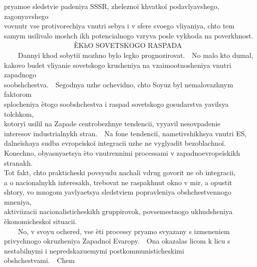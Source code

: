 {pryamoe sledstvie padeniya SSSR, zhelezno{\u i} khvatko{\u i} podavlyavshego, zagonyavshego\\
vovnutr{\cprime} vse protivorechiya vnutri sebya i v sfere svoego vliyaniya, chto tem\\
samym usilivalo moshch{\cprime} ikh potencial{\cprime}nogo vzryva posle vykhoda na poverkhnost{\cprime}.\\
{\ \ }{\ \ }{\ \ }{\ \ }{\ \ }{\ \ }{\ \ }{\ \ }{\ \ }{\ \ }\`EKhO SOVET{\cydot}SKOGO RASPADA\\
{\ \ }{\ \ }Danny{\u i} khod sobyti{\u i} mozhno bylo legko prognozirovat{\cprime}.{\ \ }No malo kto dumal,\\
kakovo budet vliyanie sovet{\cydot}skogo krusheniya na vzaimootnosheniya vnutri zapadnogo\\
soobshchestva.{\ \ }Segodnya uzhe ochevidno, chto Soyuz byl nemalovazhnym faktorom\\
splocheniya \`etogo soobshchestva i raspad sovet{\cydot}skogo gosudarstva yavilsya tolchkom,\\
kotory{\u i} usilil na Zapade centrobezhnye tendencii, vyyavil nesovpadenie\\
interesov industrial{\cprime}nykh stran.{\ \ }Na fone tendenci{\u i}, nametivshikhsya vnutri ES,\\
dal{\cprime}ne{\u i}shaya sud{\cprime}ba evrope{\u i}sko{\u i} integracii uzhe ne vyglyadit bezoblachno{\u i}.\\
Konechno, ob{\cdprime}yasnyaet{\cydot}sya \`eto vnutrennimi processami v zapadnoevrope{\u i}skikh stranakh.\\
Tot fakt, chto prakticheski povsyudu nachali vdrug govorit{\cprime} ne ob integracii,\\
a o nacional{\cprime}nykh interesakh, trebovat{\cprime} ne raspakhnut{\cprime} okno v mir, a opustit{\cprime}\\
shtory, vo mnogom yavlyaet{\cydot}sya sledstviem popravleniya obshchestvennogo mneniya,\\
aktiviizacii nacionalisticheskikh gruppirovok, povsemestnogo ukhudsheniya\\
\`ekonomichesko{\u i} situacii.\\
{\ \ }{\ \ }No, v svoyu ochered{\cprime}, vse \`eti processy pryamo svyazany s izmeneniem\\
privychnogo okruzheniya Zapadno{\u i} Evaropy.{\ \ }Ona okazalas{\cprime} licom k licu s\\
nestabil{\cprime}nymi i nepredskazuemymi postkommunisticheskimi obshchestvami.{\ \ }Chem\\
}
